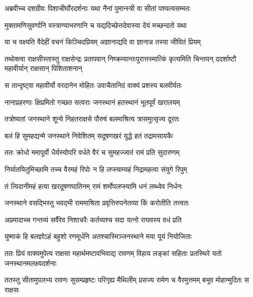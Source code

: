 \twolineshloka
{अब्रवीच्च दशग्रीवः पिशाचीर्घोरदर्शनाः}
{यथा नैनां पुमान्स्त्री वा सीतां पश्यत्यसम्मतः} %

\twolineshloka
{मुक्तामणिसुवर्णानि वस्त्राण्याभरणानि च}
{यद्यदिच्छेत्तदेवास्या देयं मच्छन्दतो यथा} %

\twolineshloka
{या च वक्ष्यति वैदेहीं वचनं किञ्चिदप्रियम्}
{अज्ञानाद्यदि वा ज्ञानान्न तस्या जीवितं प्रियम्} %

\threelineshloka
{तथोक्त्वा राक्षसीस्तास्तु राक्षसेन्द्रः प्रतापवान्}
{निष्क्रम्यान्तःपुरात्तस्मात्किं कृत्यमिति चिन्तयन्}
{ददर्शाष्टौ महावीर्यान् राक्षसान् पिशिताशनान्} %

\twolineshloka
{स तान्दृष्ट्वा महावीर्यो वरदानेन मोहितः}
{उवाचैतानिदं वाक्यं प्रशस्य बलवीर्यतः} %

\twolineshloka
{नानाप्रहरणाः क्षिप्रमितो गच्छत सत्वराः}
{जनस्थानं हतस्थानं भूतपूर्वं खरालयम्} %

\twolineshloka
{तत्रोष्यतां जनस्थाने शून्ये निहतराक्षसे}
{पौरुषं बलमाश्रित्य त्रासमुत्सृज्य दूरतः} %

\twolineshloka
{बलं हि सुमहद्यन्मे जनस्थाने निवेशितम्}
{सदूषणखरं युद्धे हतं तद्रामसायकैः} %

\twolineshloka
{ततः क्रोधो ममापूर्वो धैर्यस्योपरि वर्धते}
{वैरं च सुमहज्जातं रामं प्रति सुदारुणम्} %

\twolineshloka
{निर्यातयितुमिच्छामि तच्च वैरमहं रिपोः}
{न हि लप्स्याम्यहं निद्रामहत्वा संयुगे रिपुम्} %

\twolineshloka
{तं त्विदानीमहं हत्वा खरदूषणघातिनम्}
{रामं शर्मोपलप्स्यामि धनं लब्ध्वेव निर्धनः} %

\twolineshloka
{जनस्थाने वसद्भिस्तु भवद्भी राममाश्रिता}
{प्रवृत्तिरुपनेतव्या किं करोतीति तत्त्वतः} %

\twolineshloka
{अप्रमादाच्च गन्तव्यं सर्वैरेव निशाचरैः}
{कर्तव्यश्च सदा यत्नो राघवस्य वधं प्रति} %

\twolineshloka
{युष्माकं हि बलज्ञोऽहं बहुशो रणमूर्धनि}
{अतश्चास्मिञ्जनस्थाने मया यूयं नियोजिताः} %

\fourlineindentedshloka
{ततः प्रियं वाक्यमुपेत्य राक्षसा}
{महार्थमष्टावभिवाद्य रावणम्}
{विहाय लङ्कां सहिताः प्रतस्थिरे}
{यतो जनस्थानमलक्ष्यदर्शनाः} %

\fourlineindentedshloka
{ततस्तु सीतामुपलभ्य रावणः}
{सुसम्प्रहृष्टः परिगृह्य मैथिलीम्}
{प्रसज्य रामेण च वैरमुत्तमम्}
{बभूव मोहान्मुदितः स राक्षसः} %


